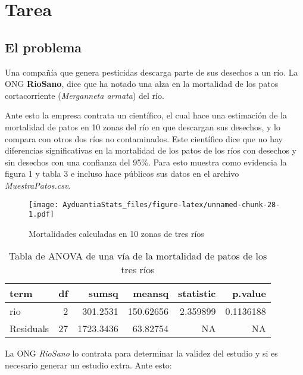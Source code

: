 \documentclass[]{book}
\begin{document}
\hypertarget{tarea}{%
\section{Tarea}\label{tarea}}

\hypertarget{el-problema}{%
\subsection{El problema}\label{el-problema}}

Una compañía que genera pesticidas descarga parte de sus desechos a un río. La ONG \textbf{RioSano}, dice que ha notado una alza en la mortalidad de los patos cortacorriente (\emph{Merganneta armata}) del río.

Ante esto la empresa contrata un científico, el cual hace una estimación de la mortalidad de patos en 10 zonas del río en que descargan sus desechos, y lo compara con otros dos ríos no contaminados. Este científico dice que no hay diferencias significativas en la mortalidad de los patos de los ríos con desechos y sin desechos con una confianza del 95\%. Para esto muestra como evidencia la figura 1 y tabla 3 e incluso hace públicos sus datos en el archivo \emph{MuestraPatos.csv}.

\begin{figure}
\centering
\texttt{[image: AyduantiaStats\_files/figure-latex/unnamed-chunk-28-1.pdf]}
\caption{\label{fig:unnamed-chunk-28}Mortalidades calculadas en 10 zonas de tres ríos}
\end{figure}

\begin{table}[t]

\caption{\label{tab:unnamed-chunk-29}Tabla de ANOVA de una vía de la mortalidad de patos de los tres ríos}
\centering
\begin{tabular}{l|r|r|r|r|r}
\hline
term & df & sumsq & meansq & statistic & p.value\\
\hline
rio & 2 & 301.2531 & 150.62656 & 2.359899 & 0.1136188\\
\hline
Residuals & 27 & 1723.3436 & 63.82754 & NA & NA\\
\hline
\end{tabular}
\end{table}

La ONG \emph{RioSano} lo contrata para determinar la validez del estudio y si es necesario generar un estudio extra. Ante esto:
\end{document}
